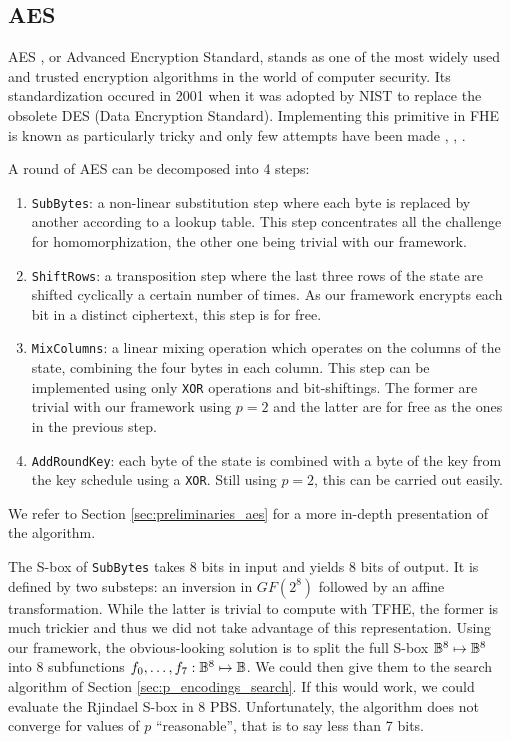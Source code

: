 \subsection{AES}
\label{sec:p_encodings_aes}


\gls{AES} \cite{aes-original}, or Advanced Encryption Standard, stands as one of the most widely used and trusted encryption algorithms in the world of computer security. Its standardization occured in 2001 when it was adopted by NIST to replace the obsolete DES (Data Encryption Standard). Implementing this primitive in \gls{FHE} is known as particularly tricky and only few attempts have been made \cite{C:GenHalSma12}, \cite{PKC:CorLepTib14}, \cite{DBLP:conf/wahc/TramaCBS23}.

A round of \gls{AES} can be decomposed into 4 steps:
\begin{enumerate}
    \item \texttt{SubBytes}: a non-linear substitution step where each byte is replaced by another according to a lookup table. This step concentrates all the challenge for homomorphization, the other one being trivial with our framework.
    \item \texttt{ShiftRows}: a transposition step where the last three rows of the state are shifted cyclically a certain number of times. As our framework encrypts each bit in a distinct ciphertext, this step is for free.
    \item \texttt{MixColumns}: a linear mixing operation which operates on the columns of the state, combining the four bytes in each column. This step can be implemented using only \texttt{XOR} operations and bit-shiftings. The former are trivial with our framework using $p=2$ and the latter are for free as the ones in the previous step.
    \item \texttt{AddRoundKey}: each byte of the state is combined with a byte of the key from the key schedule using a \texttt{XOR}. Still using $p=2$, this can be carried out easily. 
\end{enumerate}

We refer to Section \ref{sec:preliminaries_aes} for a more in-depth presentation of the algorithm. 


 The S-box of \texttt{SubBytes} takes 8 bits in input and yields 8 bits of output. It is defined by two substeps: an inversion in $GF(2^8)$ followed by an affine transformation. While the latter is trivial to compute with \gls{TFHE}, the former is much trickier and thus we did not take advantage of this representation. Using our framework, the obvious-looking solution is to split the full S-box $\mathbb{B}^8 \mapsto \mathbb{B}^8$ into 8 subfunctions $f_0, \dots, f_7: \mathbb{B}^8 \mapsto \mathbb{B}$. We could then give them to the search algorithm of Section \ref{sec:p_encodings_search}. If this would work, we could evaluate the Rjindael S-box in 8 \gls{PBS}. Unfortunately, the algorithm does not converge for values of $p$ ``reasonable'', that is to say less than 7 bits. 


